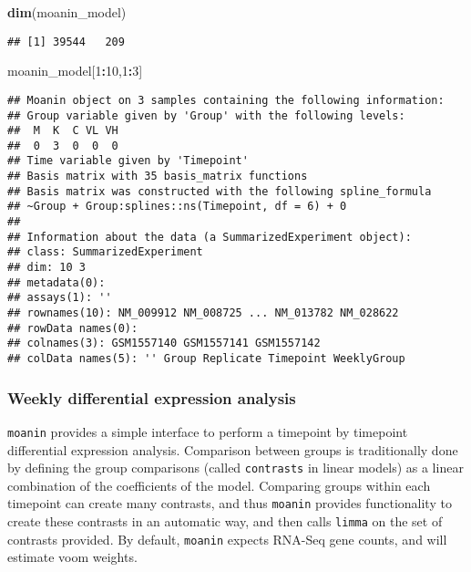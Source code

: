 \documentclass[9pt,a4paper,]{extarticle}
\newenvironment{Shaded}{\begin{snugshade}}{\end{snugshade}}
\newcommand{\DecValTok}[1]{\textcolor[rgb]{0.00,0.00,0.81}{#1}}
\newcommand{\KeywordTok}[1]{\textcolor[rgb]{0.13,0.29,0.53}{\textbf{#1}}}
\newcommand{\NormalTok}[1]{#1}
\newcommand{\OperatorTok}[1]{\textcolor[rgb]{0.81,0.36,0.00}{\textbf{#1}}}
\begin{document}
\begin{Shaded}
\begin{Highlighting}[]
\KeywordTok{dim}\NormalTok{(moanin_model)}
\end{Highlighting}
\end{Shaded}

\begin{verbatim}
## [1] 39544   209
\end{verbatim}

\begin{Shaded}
\begin{Highlighting}[]
\NormalTok{moanin_model[}\DecValTok{1}\OperatorTok{:}\DecValTok{10}\NormalTok{,}\DecValTok{1}\OperatorTok{:}\DecValTok{3}\NormalTok{]}
\end{Highlighting}
\end{Shaded}

\begin{verbatim}
## Moanin object on 3 samples containing the following information:
## Group variable given by 'Group' with the following levels:
##  M  K  C VL VH 
##  0  3  0  0  0 
## Time variable given by 'Timepoint'
## Basis matrix with 35 basis_matrix functions
## Basis matrix was constructed with the following spline_formula
## ~Group + Group:splines::ns(Timepoint, df = 6) + 0 
## 
## Information about the data (a SummarizedExperiment object):
## class: SummarizedExperiment 
## dim: 10 3 
## metadata(0):
## assays(1): ''
## rownames(10): NM_009912 NM_008725 ... NM_013782 NM_028622
## rowData names(0):
## colnames(3): GSM1557140 GSM1557141 GSM1557142
## colData names(5): '' Group Replicate Timepoint WeeklyGroup
\end{verbatim}

\hypertarget{weekly-differential-expression-analysis}{%
\subsubsection{Weekly differential expression analysis}\label{weekly-differential-expression-analysis}}

\texttt{moanin} provides a simple interface to perform a timepoint by timepoint
differential expression analysis. Comparison between groups is traditionally
done by defining the group comparisons (called \texttt{contrasts} in linear models)
as a linear combination of the coefficients of the model. Comparing groups
within each timepoint can create many contrasts, and thus \texttt{moanin} provides
functionality to create these contrasts in an automatic way, and then calls
\texttt{limma} \citep{ritchie:limma} on the set of contrasts provided. By default,
\texttt{moanin} expects RNA-Seq gene counts, and will estimate voom weights.
\end{document}
